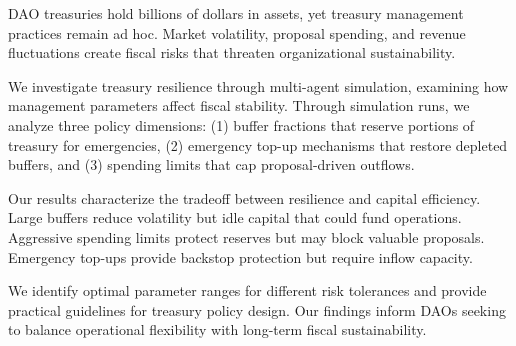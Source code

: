 
DAO treasuries hold billions of dollars in assets, yet treasury management practices remain ad hoc. Market volatility, proposal spending, and revenue fluctuations create fiscal risks that threaten organizational sustainability.

We investigate treasury resilience through multi-agent simulation, examining how management parameters affect fiscal stability. Through \experimentruns{} simulation runs, we analyze three policy dimensions: (1) buffer fractions that reserve portions of treasury for emergencies, (2) emergency top-up mechanisms that restore depleted buffers, and (3) spending limits that cap proposal-driven outflows.

Our results characterize the tradeoff between resilience and capital efficiency. Large buffers reduce volatility but idle capital that could fund operations. Aggressive spending limits protect reserves but may block valuable proposals. Emergency top-ups provide backstop protection but require inflow capacity.

We identify optimal parameter ranges for different risk tolerances and provide practical guidelines for treasury policy design. Our findings inform DAOs seeking to balance operational flexibility with long-term fiscal sustainability.
